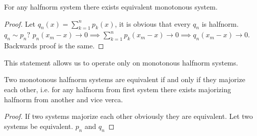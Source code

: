 \begin{stm}
  For any halfnorm system there exists equivalent monotonous system.
\end{stm}
\begin{proof}
  Let $q_n(x) = \sum\limits_{k = 1}^n p_k(x)$, it is obvious that every $q_n$ is
  halfnorm. ${q_n} \sim {p_n}?$
  $p_n(x_m - x) \to 0 \implies \sum\limits_{k = 1}^n p_k(x_m - x) \to 0 \implies
  q_n(x_m - x) \to 0$. Backwards proof is the same.
\end{proof}
This statement allows us to operate only on monotonous halfnorm systems.
\begin{stm}
  Two monotonous halfnorm systems are equivalent if and only if they majorize
  each other, i.e. for any halfnorm from first system there exists majorizing
  halfnorm from another and vice verca.
\end{stm}
\begin{proof}
  If two systems majorize each other obviously they are equivalent.
  Let two systems be equivalent. ${p_n}$ and ${q_n}$
\end{proof}
